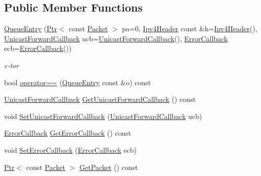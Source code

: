 \subsection*{Public Member Functions}
\begin{DoxyCompactItemize}
\item 
\hyperlink{classns3_1_1dsdv_1_1QueueEntry_ad3351b9287c5d8a0b8e06910a24164c9}{Queue\+Entry} (\hyperlink{classns3_1_1Ptr}{Ptr}$<$ const \hyperlink{classns3_1_1Packet}{Packet} $>$ pa=0, \hyperlink{classns3_1_1Ipv4Header}{Ipv4\+Header} const \&h=\hyperlink{classns3_1_1Ipv4Header}{Ipv4\+Header}(), \hyperlink{classns3_1_1dsdv_1_1QueueEntry_a5c41d545aa1e05b73ee36b718f331522}{Unicast\+Forward\+Callback} ucb=\hyperlink{classns3_1_1dsdv_1_1QueueEntry_a5c41d545aa1e05b73ee36b718f331522}{Unicast\+Forward\+Callback}(), \hyperlink{classns3_1_1dsdv_1_1QueueEntry_ad6d86a09705f644d2535f606e70c1c29}{Error\+Callback} ecb=\hyperlink{classns3_1_1dsdv_1_1QueueEntry_ad6d86a09705f644d2535f606e70c1c29}{Error\+Callback}())
\begin{DoxyCompactList}\small\item\em c-\/tor \end{DoxyCompactList}\item 
bool \hyperlink{classns3_1_1dsdv_1_1QueueEntry_aad64e3e9e034f9b9df4e5f70a8992dfb}{operator==} (\hyperlink{classns3_1_1dsdv_1_1QueueEntry}{Queue\+Entry} const \&o) const 
\item 
\hyperlink{classns3_1_1dsdv_1_1QueueEntry_a5c41d545aa1e05b73ee36b718f331522}{Unicast\+Forward\+Callback} \hyperlink{classns3_1_1dsdv_1_1QueueEntry_a82a96b47bbee02d9bcade88ca7a23eaa}{Get\+Unicast\+Forward\+Callback} () const 
\item 
void \hyperlink{classns3_1_1dsdv_1_1QueueEntry_a3749ecbebaed1289dd65c104be495343}{Set\+Unicast\+Forward\+Callback} (\hyperlink{classns3_1_1dsdv_1_1QueueEntry_a5c41d545aa1e05b73ee36b718f331522}{Unicast\+Forward\+Callback} ucb)
\item 
\hyperlink{classns3_1_1dsdv_1_1QueueEntry_ad6d86a09705f644d2535f606e70c1c29}{Error\+Callback} \hyperlink{classns3_1_1dsdv_1_1QueueEntry_a8256cbbbd0242410b98f835a70b6a1c7}{Get\+Error\+Callback} () const 
\item 
void \hyperlink{classns3_1_1dsdv_1_1QueueEntry_a3202dab6fd579cd1f9ecf6d4cbb4fb93}{Set\+Error\+Callback} (\hyperlink{classns3_1_1dsdv_1_1QueueEntry_ad6d86a09705f644d2535f606e70c1c29}{Error\+Callback} ecb)
\item 
\hyperlink{classns3_1_1Ptr}{Ptr}$<$ const \hyperlink{classns3_1_1Packet}{Packet} $>$ \hyperlink{classns3_1_1dsdv_1_1QueueEntry_aa00a73a28bca40c3c98f480c627cdfe3}{Get\+Packet} () const 

\end{DoxyCompactItemize}

